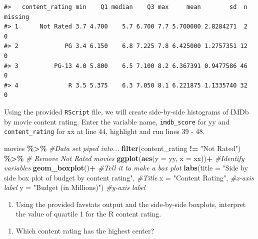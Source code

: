 \documentclass[
]{report}
\newenvironment{Shaded}{\begin{snugshade}}{\end{snugshade}}
\newcommand{\CommentTok}[1]{\textcolor[rgb]{0.56,0.35,0.01}{\textit{#1}}}
\newcommand{\DataTypeTok}[1]{\textcolor[rgb]{0.13,0.29,0.53}{#1}}
\newcommand{\KeywordTok}[1]{\textcolor[rgb]{0.13,0.29,0.53}{\textbf{#1}}}
\newcommand{\NormalTok}[1]{#1}
\newcommand{\OperatorTok}[1]{\textcolor[rgb]{0.81,0.36,0.00}{\textbf{#1}}}
\newcommand{\StringTok}[1]{\textcolor[rgb]{0.31,0.60,0.02}{#1}}
\providecommand{\tightlist}{%
  \setlength{\itemsep}{0pt}\setlength{\parskip}{0pt}}
\begin{document}
\begin{verbatim}
#>   content_rating min    Q1 median    Q3 max     mean        sd  n missing
#> 1      Not Rated 3.7 4.700    5.7 6.700 7.7 5.700000 2.8284271  2       0
#> 2             PG 3.4 6.150    6.8 7.225 7.8 6.425000 1.2757351 12       0
#> 3          PG-13 4.0 5.800    6.5 7.100 8.2 6.367391 0.9477586 46       0
#> 4              R 3.5 5.375    6.3 7.050 8.1 6.221875 1.1335740 32       0
\end{verbatim}

Using the provided \texttt{RScript} file, we will create side-by-side histograms of IMDb by movie content rating. Enter the variable name, \texttt{imdb\_score} for yy and \texttt{content\_rating} for xx at line 44, highlight and run lines 39 - 48.

\begin{Shaded}
\begin{Highlighting}[]
\NormalTok{movies }\OperatorTok{\%\textgreater{}\%}\StringTok{  }\CommentTok{\#Data set piped into...}
\StringTok{  }\KeywordTok{filter}\NormalTok{(content\_rating }\OperatorTok{!=}\StringTok{ "Not Rated"}\NormalTok{) }\OperatorTok{\%\textgreater{}\%}\StringTok{ }\CommentTok{\# Remove Not Rated movies}
\StringTok{  }\KeywordTok{ggplot}\NormalTok{(}\KeywordTok{aes}\NormalTok{(}\DataTypeTok{y =}\NormalTok{ yy, }\DataTypeTok{x =}\NormalTok{ xx))}\OperatorTok{+}\StringTok{  }\CommentTok{\#Identify variables}
\StringTok{  }\KeywordTok{geom\_boxplot}\NormalTok{()}\OperatorTok{+}\StringTok{  }\CommentTok{\#Tell it to make a box plot}
\StringTok{  }\KeywordTok{labs}\NormalTok{(}\DataTypeTok{title =} \StringTok{"Side by side box plot of budget by content rating"}\NormalTok{,  }\CommentTok{\#Title}
       \DataTypeTok{x =} \StringTok{"Content Rating"}\NormalTok{,    }\CommentTok{\#x{-}axis label}
       \DataTypeTok{y =} \StringTok{"Budget (in Millions)"}\NormalTok{)  }\CommentTok{\#y{-}axis label}
\end{Highlighting}
\end{Shaded}

\begin{enumerate}
\def\labelenumi{\arabic{enumi}.}
\tightlist
\item
  Using the provided favstats output and the side-by-side boxplots, interpret the value of quartile 1 for the R content rating.
\end{enumerate}

\vspace{1in}

\begin{enumerate}
\def\labelenumi{\arabic{enumi}.}
\setcounter{enumi}{1}
\tightlist
\item
  Which content rating has the highest center?
\end{enumerate}
\end{document}
